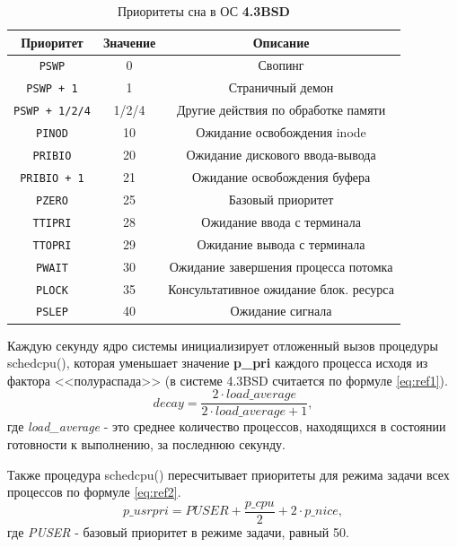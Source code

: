 \begin{table}[h]
	\captionsetup{justification=raggedright,singlelinecheck=off,margin=2mm}
	\caption{Приоритеты
		сна в ОС \textbf{4.3BSD}}
	\label{tab:bsd}
	\begin{center}
		\begin{tabular}{ |c|c|c|  }
			\hline
			\textbf{Приоритет} & \textbf{Значение} & \textbf{Описание} \\
			\hline
			\texttt{PSWP} & 0 & Свопинг \\
			\hline
			\texttt{PSWP + 1} & 1 & Страничный демон \\
			\hline	
			\texttt{PSWP + 1/2/4} & 1/2/4 & Другие действия по обработке памяти \\
			\hline
			\texttt{PINOD} & 10 & Ожидание освобождения inode \\
			\hline
			\texttt{PRIBIO} & 20 & Ожидание дискового ввода-вывода \\
			\hline
			\texttt{PRIBIO + 1} & 21 & Ожидание освобождения буфера \\
			\hline
			\texttt{PZERO} & 25 & Базовый приоритет \\
			\hline
			\texttt{TTIPRI} & 28 & Ожидание ввода с терминала \\
			\hline
			\texttt{TTOPRI} & 29 & Ожидание вывода с терминала \\
			\hline 
			\texttt{PWAIT} & 30 & Ожидание завершения процесса потомка \\
			\hline
			\texttt{PLOCK} & 35 & Консультативное ожидание блок. ресурса \\
			\hline
			\texttt{PSLEP} & 40 & Ожидание сигнала \\
			\hline
		\end{tabular}
	\end{center}
\end{table}

Каждую секунду ядро системы инициализирует отложенный вызов процедуры schedcpu(), которая уменьшает значение \textbf{p\_pri} каждого процесса исходя из фактора <<полураспада>> (в системе 4.3BSD считается по формуле \ref{eq:ref1}).
\begin{equation}
	\label{eq:ref1}
	decay = \frac{2 \cdot load\_average}{2 \cdot load\_average + 1},
\end{equation} где
\textit{load\_average} - это среднее количество процессов, находящихся в состоянии готовности к выполнению, за последнюю секунду.

Также процедура schedcpu() пересчитывает приоритеты для режима задачи
всех процессов по формуле \ref{eq:ref2}.
\begin{equation}
	\label{eq:ref2}
	p\_usrpri = PUSER + \frac{p\_cpu}{2} + 2 \cdot p\_nice,
\end{equation}где \textit{PUSER} - базовый приоритет в режиме задачи, равный 50.

